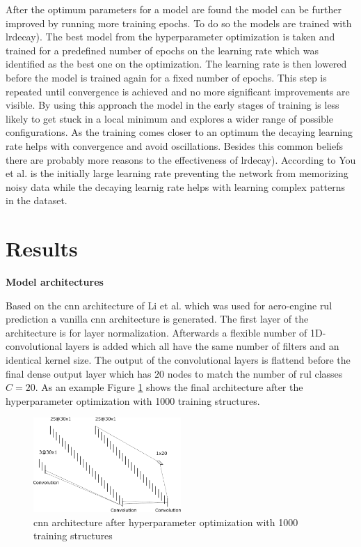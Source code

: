 \documentclass[conference]{IEEEtran}
\begin{document}
After the optimum parameters for a model are found the model can be further improved by running more training epochs. To do so the models are trained with \gls{lrdecay)}. The best model from the hyperparameter optimization is taken and trained for a predefined number of epochs on the learning rate which was identified as the best one on the optimization. The learning rate is then lowered before the model is trained again for a fixed number of epochs. This step is repeated until convergence is achieved and no more significant improvements are visible. By using this approach the model in the early stages of training is less likely to get stuck in a local minimum and explores a wider range of possible configurations. As the training comes closer to an optimum the decaying learning rate helps with convergence and avoid oscillations. Besides this common beliefs there are probably more reasons to the effectiveness of \gls{lrdecay)}. According to You et al. \cite{You2019} is the initially large learning rate preventing the network from memorizing noisy data while the decaying learnig rate helps with learning complex patterns in the dataset.


\section{Results}
\label{sec:results}


\noindent
\textbf{Model architectures}

Based on the \gls{cnn} architecture of Li et al. \cite{Li2018} which was used for aero-engine \gls{rul} prediction a vanilla \gls{cnn} architecture is generated. The first layer of the architecture is for layer normalization. Afterwards a flexible number of 1D-convolutional layers is added which all have the same number of filters and an identical kernel size. The output of the convolutional layers is flattend before the final dense output layer which has $ 20 $ nodes to match the number of \gls{rul} classes $ C = 20 $. As an example Figure \ref{fig:cnn_architecture_1000_structures} shows the final architecture after the hyperparameter optimization with 1000 training structures.

\begin{figure}[htp]
	\centering
	\includegraphics[width=0.5\textwidth]{cnn_architecture_1000_structures.pdf}
	\caption{\gls{cnn} architecture after hyperparameter optimization with 1000 training structures}
	\label{fig:cnn_architecture_1000_structures}
\end{figure}
\end{document}
